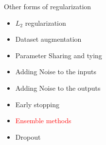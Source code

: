 \begin{frame}
\end{frame}

\begin{frame}
	\vspace{4em}
	\begin{overlayarea}{\textwidth}{\textheight}
		\begin{block}{Other forms of regularization}
			\begin{itemize}
				\item $L_2$ regularization
				\item Dataset augmentation
				\item Parameter Sharing and tying
				\item Adding Noise to the inputs
				\item Adding Noise to the outputs 
				\item Early stopping
				\item \textcolor<2->{red}{Ensemble methods}
				\item Dropout
			\end{itemize}
		\end{block}
	\end{overlayarea}
\end{frame}

